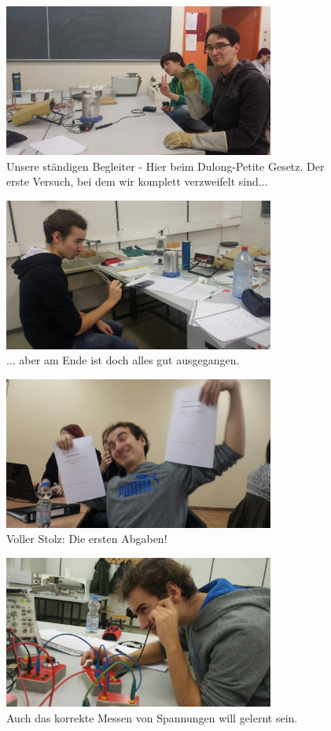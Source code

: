 \begin{figure}
  \centering
  \includegraphics[height=5cm]{extra/photo_2016-07-05_00-37-24.jpg}
  \caption{Unsere ständigen Begleiter - Hier beim Dulong-Petite Gesetz. Der erste Versuch, bei dem wir komplett verzweifelt sind...}
\end{figure}

\begin{figure}
  \centering
  \includegraphics[height=5cm]{extra/photo_2016-07-05_00-39-07.jpg}
  \caption{... aber am Ende ist doch alles gut ausgegangen.}
\end{figure}

\begin{figure}
  \centering
  \includegraphics[height=5cm]{extra/photo_2016-07-05_00-39-29.jpg}
  \caption{Voller Stolz: Die ersten Abgaben!}
\end{figure}

\begin{figure}
  \centering
  \includegraphics[height=5cm]{extra/photo_2016-07-05_00-40-34.jpg}
  \caption{Auch das korrekte Messen von Spannungen will gelernt sein.}
\end{figure}

